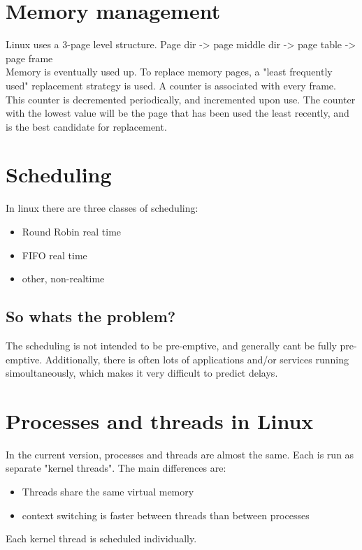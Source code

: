 \section{Memory management}
Linux uses a 3-page level structure. \newline
Page dir -> page middle dir -> page table -> page frame \\

Memory is eventually used up. To replace memory pages, a "least frequently used" replacement strategy is used. A counter is associated with every frame. This counter is decremented periodically, and incremented upon use. The counter with the lowest value will be the page that has been used the least recently, and is the best candidate for replacement.

\section{Scheduling}
In linux there are three classes of scheduling:
\begin{itemize}
    \item Round Robin real time
    \item FIFO real time
    \item other, non-realtime
\end{itemize}

\subsection{So whats the problem?}
The scheduling is not intended to be pre-emptive, and generally cant be fully pre-emptive. Additionally, there is often lots of applications and/or services running simoultaneously, which makes it very difficult to predict delays.


\section{Processes and threads in Linux}
In the current version, processes and threads are almost the same. Each is run as separate "kernel threads".
The main differences are:
\begin{itemize}
    \item Threads share the same virtual memory
    \item context switching is faster between threads than between processes
\end{itemize}

Each kernel thread is scheduled individually.